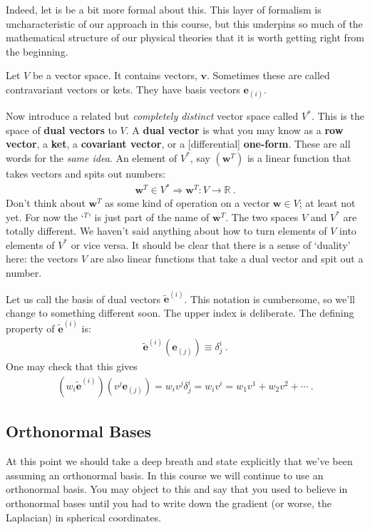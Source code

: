 \documentclass[12pt]{article}
\numberwithin{equation}{section}    %
\renewcommand{\tilde}{\widetilde}   %
\renewcommand{\vec}[1]{\mathbf{#1}} %
\begin{document}
Indeed, let is be a bit more formal about this. This layer of formalism is uncharacteristic of our approach in this course, but this underpins so much of the mathematical structure of our physical theories that it is worth getting right from the beginning. 

Let $V$ be a vector space. It contains vectors, $\vec{v}$. Sometimes these are called contravariant vectors or kets. They have basis vectors $\vec{e}_{(i)}$. 

Now introduce a related but \emph{completely distinct} vector space called $V^*$. This is the space of \textbf{dual vectors} to $V$. A \textbf{dual vector} is what you may know as a \textbf{row vector}, a \textbf{ket}, a \textbf{covariant vector}, or a [differential] \textbf{one-form}. These are all words for the \emph{same idea}. An element of $V^*$, say $(\vec{w}^T)$ is a linear function that takes vectors and spits out numbers:
\begin{align}
  \vec{w}^T \in V^* \Rightarrow \vec{w}^T: V \to \mathbb{R} \ .
 \end{align}
Don’t think about $\vec{w}^T$ as some kind of operation on a vector $\vec{w}\in V$; at least not yet. For now the `$^T$' is just part of the name of $\vec{w}^T$. The two spaces $V$ and $V^*$ are totally different. We haven’t said anything about how to turn elements of $V$ into elements of $V^*$ or vice versa.
%
It should be clear that there is a sense of `duality’ here: the vectors $V$ are also linear functions that take a dual vector and spit out a number. 

Let us call the basis of dual vectors $\tilde{\vec{e}}^{(i)}$. This notation is cumbersome, so we’ll change to something different soon. The upper index is deliberate. The defining property of $\tilde{\vec{e}}^{(i)}$ is:
\begin{align}
  \tilde{\vec{e}}^{(i)}\left(\vec{e}_{(j)}\right) \equiv \delta^i_j \ .
\end{align}
One may check that this gives
\begin{align}
  \left(w_i\tilde{\vec{e}}^{(i)}\right)\left(v^j\vec{e}_{(j)}\right)
  = w_i v^j \delta^i_j = w_i v^i = w_1 v^1 + w_2 v^2 + \cdots \ .
\end{align}



\subsection{Orthonormal Bases}

At this point we should take a deep breath and state explicitly that we’ve been assuming an orthonormal basis. In this course we will continue to use an orthonormal basis. You may object to this and say that you used to believe in orthonormal bases until you had to write down the gradient (or worse, the Laplacian) in spherical coordinates. 
\end{document}
